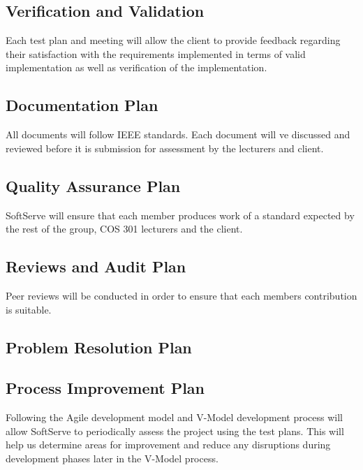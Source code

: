 \documentclass[12pt]{article}
\begin{document}
\subsection{Verification and Validation}
Each test plan and meeting will allow the client to provide feedback regarding their satisfaction with the requirements implemented in terms of valid implementation as well as verification of the implementation.
 
\subsection{Documentation Plan}
All documents will follow IEEE standards. Each document will ve discussed and reviewed before it is submission for assessment by the lecturers and client.
 
\subsection{Quality Assurance Plan}
SoftServe will ensure that each member produces work of a standard expected by the rest of the group, COS 301 lecturers and the client.

\subsection{Reviews and Audit Plan}
Peer reviews will be conducted in order to ensure that each members contribution is suitable.

\subsection{Problem Resolution Plan}

\subsection{Process Improvement Plan}
Following the Agile development model and V-Model development process will allow SoftServe to periodically assess the project using the test plans. This will help us determine areas for improvement and reduce any disruptions during development phases later in the V-Model process.
\end{document}
